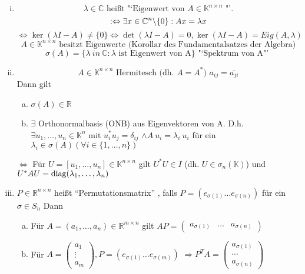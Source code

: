 \begin{enumerate}[(i)]
\item
\[
\lambda \in \mathbb{C}\text{ heißt "`Eigenwert von } A \in
\mathbb{K}^{n \times n} \text{ "'.} \]
\[
: \Leftrightarrow \exists x \in \mathbb{C}^n \backslash \{0\}: Ax = \lambda x \\
\]\[
\Leftrightarrow \ker (\lambda I -A) \neq \{0\} \Leftrightarrow
\det (\lambda I -A) =0, \ker (\lambda I-A) = Eig (A, \lambda)
\]\[
A \in \mathbb{K}^{n \times n} \text{ besitzt Eigenwerte (Korollar des
Fundamentalsatzes der Algebra)}
\]\[
\sigma (A) = \{ \lambda \ in~ \mathbb{C}: \lambda \text{ ist Eigenwert
von A}\} \text{ "`Spektrum von A"' }
\]
\item
\[
A \in \mathbb{K}^{n \times n} \text{ Hermitesch (dh. } A = A^\ast \text{) } a_{ij} = \overline{a_{ji}}
\]
Dann gilt
\begin{enumerate}[(a)]
\item
$ \sigma(A) \in \mathbb{R}$
\item
$\exists$ Orthonormalbasis (ONB) aus Eigenvektoren von A. D.h. $\exists u_1, \dots, u_n \in \mathbb{K}^n \text{ mit } u_i^\ast u_j = \delta_{ij}$
$\land A~u_i = \lambda_i~u_i$ für ein $\lambda_i \in \sigma(A)
(\forall i \in \{1, \dots, n\})$
\end{enumerate}
$\Leftrightarrow$ Für $U = [u_1, \dots, u_n] \in \mathbb{K}^{n\times n}$ gilt $U^\ast U \in I$
(dh. $U \in \sigma_n(\mathbb{K})$) und
$U^\ast AU = \operatorname*{\mathrm{diag}}(\lambda_1, \dots, \lambda_n)$

\item
	$P \in \mathbb{R}^{n \times n}$ heißt "`Permutationsmatrix"' , falls $P=(e_{\sigma(1)} \dots e_{\sigma(n)})$ für ein $\sigma \in S_n$
	Dann
	\begin{enumerate}[(a)]
	\item Für $A = (a_1, \dots, a_n) \in \mathbb{R}^{m \times n}$ gilt
	$AP = \begin{pmatrix} a_{\sigma(1)} & \dots & a_{\sigma(n)}\end{pmatrix}$
	\item
	Für $A = \begin{pmatrix} a_1 \\ \vdots \\ a_m \end{pmatrix}, P = (e_{\sigma(1)} \dots e_{\sigma(m)})$
	$\Rightarrow P^T A = \begin{pmatrix} a_{\sigma(1)} \\ \cdots \\ a_{\sigma(n)}  \end{pmatrix}$
\end{enumerate}
\end{enumerate}
